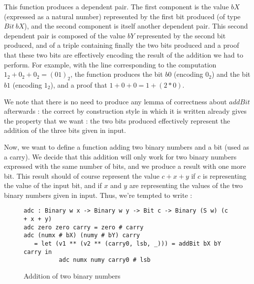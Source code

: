 This function produces a dependent pair. The first component is the value $bX$ (expressed as a natural number) represented by the first bit produced (of type $Bit\ bX$), and the second component is itself another dependent pair. This second dependent pair is composed of the value $bY$ represented by the second bit produced, and of a triple containing finally the two bits produced and a proof that these two bits are effectively encoding the result of the addition we had to perform.
For example, with the line corresponding to the computation $1_2 + 0_2 + 0_2 = (01)_2$, the function produces the bit $b0$ (encoding $0_2$) and the bit $b1$ (encoding $1_2$), and a proof that $1 + 0 + 0 = 1 + (2*0)$.

We note that there is no need to produce any lemma of correctness about $addBit$ afterwards : the correct by construction style in which it is written already gives the property that we want : the two bits produced effectively represent the addition of the three bits given in input.

Now, we want to define a function adding two binary numbers and a bit (used as a carry). We decide that this addition will only work for two binary numbers expressed with the same number of bits, and we produce a result with one more bit. This result should of course represent the value $c + x + y$ if $c$ is representing the value of the input bit, and if $x$ and $y$ are representing the values of the two binary numbers given in input. Thus, we're tempted to write :
\begin{figure}[H]
\figrule
\begin{center}
\begin{verbatim}
adc : Binary w x -> Binary w y -> Bit c -> Binary (S w) (c + x + y)
adc zero zero carry = zero # carry
adc (numx # bX) (numy # bY) carry
   = let (v1 ** (v2 ** (carry0, lsb, _))) = addBit bX bY carry in
          adc numx numy carry0 # lsb
\end{verbatim}
\end{center}
\caption{Addition of two binary numbers}
\figrule
\end{figure}


